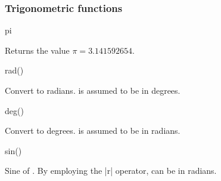 \subsubsection{Trigonometric functions}

\label{pgfmath-functions-trigonometric}

\begin{math-function}{pi}
\mathcommand

	Returns the value $\pi=3.141592654$.
	
\begin{codeexample}[]
 \pgfmathresult
\end{codeexample}

\begin{codeexample}[]
 \pgfmathresult
\end{codeexample}

\end{math-function}

\begin{math-function}{rad()}
\mathcommand

	Convert  to radians.  is assumed to be in degrees.
	
\begin{codeexample}[]
 \pgfmathresult
\end{codeexample}

\end{math-function}

\begin{math-function}{deg()}
\mathcommand

	Convert  to degrees.  is assumed to be in radians.
	
\begin{codeexample}[]
 \pgfmathresult
\end{codeexample}

\end{math-function}

\begin{math-function}{sin()}
\mathcommand

	Sine of . By employing the |r| operator,  can be in
	radians.
	
\begin{codeexample}[]
 \pgfmathresult
\end{codeexample}

\begin{codeexample}[]
 \pgfmathresult
\end{codeexample}

\end{math-function}

